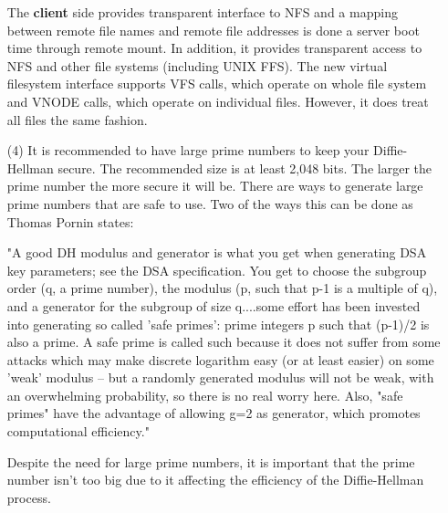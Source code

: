 \documentclass{article}
\begin{document}
\begin{itemize}
    The \textbf{client} side provides transparent interface to NFS and a mapping between remote file names and remote file addresses is done a server boot time through remote mount. In addition, it provides transparent access to NFS and other file systems (including UNIX FFS). The new virtual filesystem interface supports VFS calls, which operate on whole file system and VNODE calls, which operate on individual files. However, it does treat all files the same fashion.

    \item[(4)] It is recommended to have large prime numbers to keep your Diffie-Hellman secure. The recommended size is at least 2,048 bits. The larger the prime number the more secure it will be. There are ways to generate large prime numbers that are safe to use. Two of the ways this can be done as Thomas Pornin states: 
    \begin{displayquote}
        "A good DH modulus and generator is what you get when generating DSA key parameters; see the DSA specification. You get to choose the subgroup order (q, a prime number), the modulus (p, such that p-1 is a multiple of q), and a generator for the subgroup of size q....some effort has been invested into generating so called 'safe primes': prime integers p such that (p-1)/2 is also a prime. A safe prime is called such because it does not suffer from some attacks which may make discrete logarithm easy (or at least easier) on some 'weak' modulus -- but a randomly generated modulus will not be weak, with an overwhelming probability, so there is no real worry here. Also, "safe primes" have the advantage of allowing g=2 as generator, which promotes computational efficiency." 
    \end{displayquote}
    
    Despite the need for large prime numbers, it is important that the prime number isn't too big due to it affecting the efficiency of the Diffie-Hellman process.
    
\end{itemize}
\end{document}

